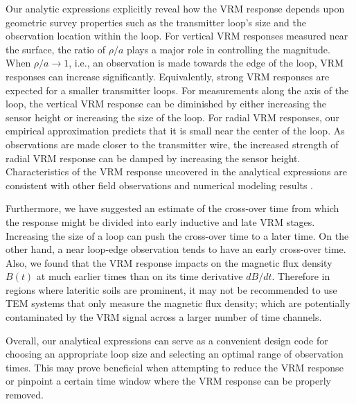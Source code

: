 \documentclass[onecolumn]{IEEEtran} %
\begin{document}
Our analytic expressions explicitly reveal how the
VRM response depends upon geometric survey properties such as the transmitter
loop's size and the observation location within the loop. For
vertical VRM responses measured near the surface, the ratio of $\rho/a$ plays
a major role in controlling the magnitude. When $\rho/a \rightarrow
1$, i.e., an observation is made towards the edge of the loop, VRM
responses can increase significantly. Equivalently, strong VRM
responses are expected for a smaller transmitter loops. For
measurements along the axis of the loop, the vertical VRM response
 can be diminished by either increasing the
sensor height or increasing the size of the loop. For radial VRM
responses, our empirical approximation predicts that it is small
near the center of the loop. As observations are made closer to the
transmitter wire, the increased strength of radial VRM response can be damped
by increasing the sensor height. Characteristics of the VRM response uncovered in
the analytical expressions are
consistent with other field observations and numerical modeling
results \cite{Buselli1982, Barsukov2001, Billings2003,
Kozhevnikov2007,Pasion2007, Zadorozhnaya2012}.

Furthermore, we have suggested an estimate of the
cross-over time from which the response might be divided into early
inductive and late VRM stages. Increasing the size of a loop can
push the cross-over time to a later time. On the other hand, a near
loop-edge observation tends to have an early cross-over time. Also, we
found that the VRM response impacts on the magnetic flux density $B(t)$ at
much earlier times than on its time derivative $dB/dt$. Therefore in
regions where lateritic soils are prominent, it may not be
recommended to use TEM systems that only measure the magnetic flux
density; which are potentially contaminated by the VRM signal across a
larger number of time channels.

Overall, our analytical expressions can serve as a
convenient design code for choosing an appropriate loop size and
selecting an optimal range of observation times. This may prove beneficial when attempting to reduce the VRM
response or pinpoint a certain time window where the VRM response can be
properly removed.



\end{document}

